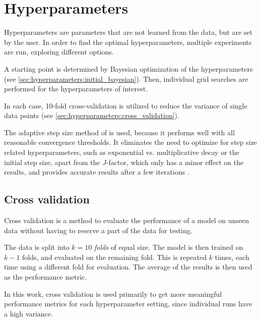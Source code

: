 \section{Hyperparameters}
Hyperparameters are parameters that are not learned from the data,
but are set by the user.
%
In order to find the optimal hyperparameters,
multiple experiments are run,
exploring different options.


A starting point is determined by Bayesian optimization of the hyperparameters
  (see \autoref{sec:hyperparameters:initial_bayesian}).
Then, individual grid searches are performed for the hyperparameters of interest.

In each case, 10-fold cross-validation is utilized to reduce the variance of single data points
  (see \autoref{sec:hyperparameters:cross_validation}).

The adaptive step size method of \dseaplus is used,
because it performs well with all reasonable convergence thresholds.
It eliminates the need to optimize for step size related hyperparameters,
  such as
    exponential vs. multiplicative decay
    or the initial step size,
  apart from the $J$-factor,
    which only has a minor effect on the results,
and provides accurate results after a few iterations \cite{dsea_mirko}.



\subsection{Cross validation} \label{sec:hyperparameters:cross_validation}
Cross validation is a method to evaluate the performance of a model on unseen data
without having to reserve a part of the data for testing.

The data is split into $k = 10$ \emph{folds} of equal size.
The model is then trained on $k-1$ folds,
and evaluated on the remaining fold.
This is repeated $k$ times,
each time using a different fold for evaluation.
The average of the results is then used as the performance metric.

In this work,
cross validation is used primarily to get more meaningful performance metrics
for each hyperparameter setting,
since individual runs have a high variance.

